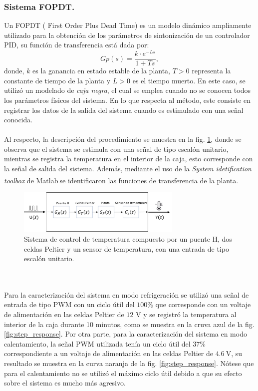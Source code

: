 \subsubsection{Sistema FOPDT.}
Un FOPDT ( First Order Plus Dead Time) es un modelo dinámico ampliamente utilizado para la obtención de los parámetros de sintonización de un controlador PID, su función de transferencia está dada por:
\begin{equation}
Gp(s)=  \frac{k\cdot e^{-Ls}}{1+Ts},
\label{FOPDT_model}
\end{equation}
donde, $k$ es la ganancia en estado estable de la planta, $T > 0$  representa la constante de tiempo de la planta y $L > 0$ es el tiempo muerto. En este caso, se utilizó un modelado de \textit{caja negra}, el cual se emplea cuando no se conocen todos los parámetros físicos del sistema. En lo que respecta al método, este consiste en registrar los datos de la salida del sistema cuando es estimulado  con una señal conocida.\\ \\
Al respecto, la descripción del procedimiento se muestra en la fig. \ref{fig:Modelo_caja_negra}, donde se observa que el sistema se estimula con una señal de tipo escalón unitario, mientras se registra la temperatura en el interior de la caja, esto corresponde con la señal de salida del sistema. Además, mediante el uso de la \textit{System idetification toolbox} de Matlab\textsuperscript \textregistered $~$se identificaron las funciones de transferencia de la planta.
\begin{figure}[h!]
\begin{centering}
  \includegraphics[width=0.7\textwidth]{Images/Modelo_caja_negra.png}
    \caption{Sistema de control de temperatura compuesto por un puente H, dos celdas Peltier y un sensor de temperatura, con una entrada de tipo escalón unitario.}
    \label{fig:Modelo_caja_negra}
  \par\end{centering}
\end{figure}
\\ \\
Para la caracterización del sistema en modo refrigeración se utilizó una señal de entrada de tipo PWM con un ciclo útil del $100\%$ que corresponde con un voltaje de alimentación en las celdas Peltier de $12$ V y se registró la temperatura al interior de la caja durante 10 minutos, como se muestra en la cruva azul de la fig. \ref{fig:step_response}. Por otra parte, para la caracterización del sistema en modo calentamiento, la señal PWM utilizada tenía un ciclo útil del  $37\%$ correspondiente a un voltaje de alimentación en las celdas Peltier de $4.6~\mbox{V}$, su resultado se muestra en la curva naranja de la fig. \ref{fig:step_response}. Nótese que para el calentamiento no se utilizó el máximo ciclo útil debido a  que su efecto sobre el sistema es mucho más agresivo.
